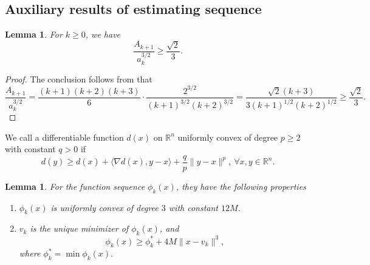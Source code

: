 \documentclass{article}
\newtheorem{lemma}[theorem]{Lemma}
\numberwithin{equation}{section}
\numberwithin{equation}{section}
\begin{document}
\subsection{Auxiliary results of estimating sequence}
\begin{lemma}
    \label{lem.magnitude a and A}
    For $k\geq 0$, we have
    \begin{equation}
        \label{eq.magnitude a and A}
        \frac{A_{k+1}}{a_k^{3/2}} \geq \frac{\sqrt{2}}{3}.
    \end{equation}
\end{lemma}
\begin{proof}The conclusion follows from that
    $$\frac{A_{k+1}}{a_k^{3/2}}= \frac{(k+1)(k+2)(k+3)}{6}\cdot \frac{2^{3/2}}{(k+1)^{3/2}(k+2)^{3/2}} = \frac{\sqrt{2}(k+3)}{3(k+1)^{1/2}(k+2)^{1/2}} \geq \frac{\sqrt{2}}{3}.$$
\end{proof}
We call a differentiable function $d(x)$ on $\mathbb{R}^n$ uniformly convex \cite[Section 4.2.2]{nesterov2018lectures} of degree $p\geq 2$ with constant $q>0$ if
\begin{equation}
    \label{eq.uniformly convex of p}
    d(y)\geq d(x)+\langle \nabla d(x),y-x\rangle +\frac{q}{p}\|y-x\|^p, \ \forall x,y\in\mathbb{R}^n.
\end{equation}
\begin{lemma}
    \label{lem.property of phi}
    For the function sequence $\phi_k(x)$, they have the following properties
    \begin{enumerate}[label=(\roman*)]
        \item $\phi_k(x)$ is uniformly convex of degree $3$ with constant $12M$.
        \item $v_k$ is the unique minimizer of $\phi_k(x)$, and
              \begin{equation}
                  \label{eq.phi_k phi_low}
                  \phi_k(x)\geq \phi_k^* + 4M\|x-v_k\|^3,
              \end{equation}
              where $\phi_k^* =\min \phi_k(x).$
    \end{enumerate}
\end{lemma}
\end{document}
